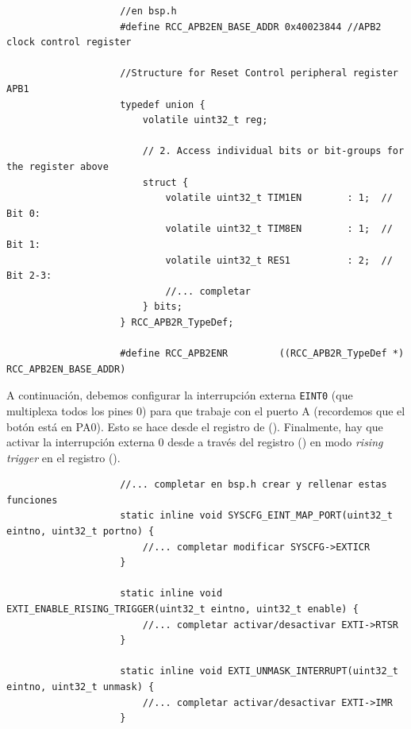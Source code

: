 \documentclass[../main.tex]{subfiles}
\begin{document}
\begin{enumerate}
                \begin{lstlisting}
                    //en bsp.h
                    #define RCC_APB2EN_BASE_ADDR 0x40023844 //APB2 clock control register
                    
                    //Structure for Reset Control peripheral register APB1
                    typedef union {
                        volatile uint32_t reg;

                        // 2. Access individual bits or bit-groups for the register above
                        struct {
                            volatile uint32_t TIM1EN	   	: 1;  // Bit 0:
                            volatile uint32_t TIM8EN	   	: 1;  // Bit 1:
                            volatile uint32_t RES1		   	: 2;  // Bit 2-3:
                            //... completar
                        } bits;
                    } RCC_APB2R_TypeDef;

                    #define RCC_APB2ENR			((RCC_APB2R_TypeDef *) RCC_APB2EN_BASE_ADDR)
                \end{lstlisting}

            
            A continuación, debemos configurar la interrupción externa \texttt{EINT0} (que multiplexa todos los pines 0) para que trabaje con el puerto A (recordemos que el botón está en PA0). Esto se hace desde el registro  de  (\REFMAN[7.2.3]). Finalmente, hay que activar la interrupción externa 0 desde  a través del registro  (\REFMAN[10.9.1]) en modo \emph{rising trigger} en el registro  (\REFMAN[10.9.3]).
            

                \begin{lstlisting}
                    //... completar en bsp.h crear y rellenar estas funciones
                    static inline void SYSCFG_EINT_MAP_PORT(uint32_t eintno, uint32_t portno) {
                        //... completar modificar SYSCFG->EXTICR
                    }

                    static inline void EXTI_ENABLE_RISING_TRIGGER(uint32_t eintno, uint32_t enable) {
                        //... completar activar/desactivar EXTI->RTSR
                    }

                    static inline void EXTI_UNMASK_INTERRUPT(uint32_t eintno, uint32_t unmask) {
                        //... completar activar/desactivar EXTI->IMR
                    }



\end{lstlisting}
\end{enumerate}
\end{document}
